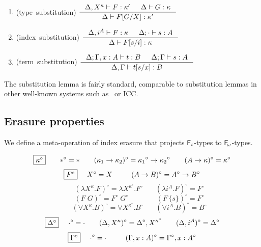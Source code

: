 \begin{lemma}[substitution]\mbox{}\\[-3mm]
\label{lem:subst}
\begin{enumerate}
\item
\label{lem:tysubst}
\mbox{\rm (type substitution)}
$\inference{\Delta,X^\kappa |- F:\kappa' & \Delta |- G:\kappa}
	{\Delta |- F[G/X]:\kappa'} $
\medskip

\item
\label{lem:ixsubst}
\mbox{\rm (index substitution)}
$ \inference{\Delta,i^A |- F:\kappa & \Delta;\cdot |- s:A}
	{\Delta |- F[s/i]:\kappa} $
\medskip

\item
\label{lem:tmsubst}
\mbox{\rm (term substitution)}
$ \inference{\Delta;\Gamma,x:A |- t:B & \Delta;\Gamma |- s:A}
	{\Delta,\Gamma |- t[s/x]:B} $
\end{enumerate}
\end{lemma}
The substitution lemma is fairly standard, comparable to substitution lemmas
in other well-known systems such as \Fw\ or ICC.

\subsection{Erasure properties}
\label{ssec:fi:erasure}

We define a meta-operation of index erasure that projects $\Fi$-types
to $\Fw$-types.

\begin{definition}\label{def:ierase}
\[ \fbox{$\kappa^\circ$}
 ~~~~ ~~
 *^\circ =
 *
 ~~~~ ~~
 (\kappa_1 -> \kappa_2)^\circ =
 {\kappa_1}^\circ -> {\kappa_2}^\circ
 ~~~~ ~~
 (A -> \kappa)^\circ =
 \kappa^\circ
\]
\[ \fbox{$F^\circ$}
 ~~~~
 X^\circ =
 X
 ~~~~ ~~~~
 (A -> B)^\circ =
 A^\circ -> B^\circ
\]
\[ \qquad
 (\lambda X^\kappa.F)^\circ =
 \lambda X^{\kappa^\circ}.F^\circ
 ~~~~ ~~~~
 (\lambda i^A.F)^\circ =
 F^\circ
\]
\[ \qquad
 (F\;G)^\circ =
 F^\circ\;G^\circ
 ~~~~ ~~~~ ~~~~ ~~~~ ~~
 (F\,\{s\})^\circ =
 F^\circ
\]
\[ \qquad
 (\forall X^\kappa . B)^\circ =
 \forall X^{\kappa^\circ} . B^\circ
 ~~~~ ~~~~
 (\forall i^A . B)^\circ =
 B^\circ
\]
\[ \fbox{$\Delta^\circ$}
 ~~~~
 \cdot^\circ = \cdot
 ~~~~ ~~
 (\Delta,X^\kappa)^\circ = \Delta^\circ,X^{\kappa^\circ}
 ~~~~ ~~
 (\Delta,i^A)^\circ = \Delta^\circ
\]
\[ \fbox{$\Gamma^\circ$}
 ~~~~
 \cdot^\circ = \cdot
 ~~~~ ~~~~
 (\Gamma,x:A)^\circ = \Gamma^\circ,x:A^\circ
\]
\end{definition}

